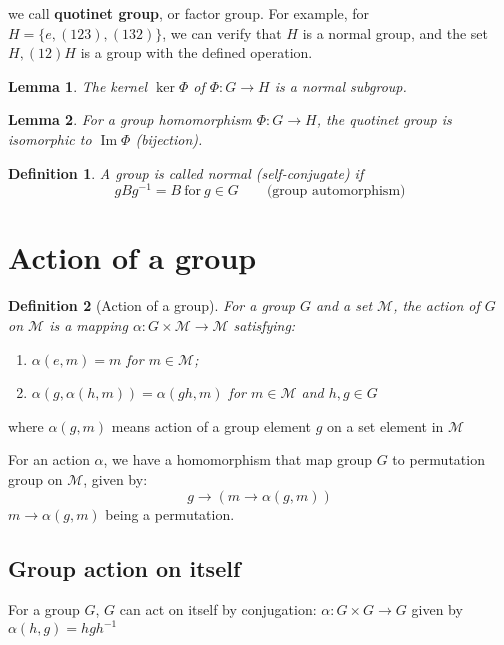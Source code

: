 \documentclass{amsart}
\newcommand{\setM}{\mathcal{M}}
\newtheorem{definition}{Definition}
\newtheorem{lemma}{Lemma}
\DeclareMathOperator{\Image}{Im}
\begin{document}
we call \textbf{quotinet group}, or factor group.
For example, for $H = \{e,(123),(132)\}$, we can verify that $H$ is a normal group, and the 
set ${H, (12)H}$ is a group with the defined operation.

\begin{lemma}
    The kernel $\ker\Phi$ of $\Phi\colon G\to H$ is a normal subgroup.
\end{lemma}

\begin{lemma}
    For a group homomorphism $\Phi\colon G\to H$, the quotinet group is isomorphic to $\Image\Phi$ (bijection).
\end{lemma}


\begin{definition}
    A group is called normal (self-conjugate) if 
    \[
        gBg^{-1} = B\ \text{for}\ g \in G \qquad \text{(group automorphism)}    
    \]
\end{definition}

\section{Action of a group}

\begin{definition}
    [Action of a group]
    For a group $G$ and a set $\setM$, the action of $G$ on $\setM$ is a mapping 
    $\alpha\colon G\times \setM \to \setM$ satisfying:
    \begin{enumerate}
        \item $\alpha(e,m) = m$ for $m \in \setM$;
        \item $\alpha(g, \alpha(h,m)) = \alpha(gh, m)$ for $m\in \setM$ and $h,g\in G$
    \end{enumerate}
\end{definition}
where $\alpha(g,m)$ means action of a group element $g$ on a set element in $\setM$

For an action $\alpha$, we have a homomorphism that map group $G$ to permutation group on $\setM$, 
given by:
\[g\to (m\to \alpha(g,m))\]
$m\to \alpha(g,m)$ being a permutation. 

\subsection*{Group action on itself}
For a group $G$, $G$ can act on itself by conjugation: $\alpha\colon G\times G \to G$ given by
$\alpha(h,g) = hgh^{-1}$

\vspace{10pt}
\end{document}
